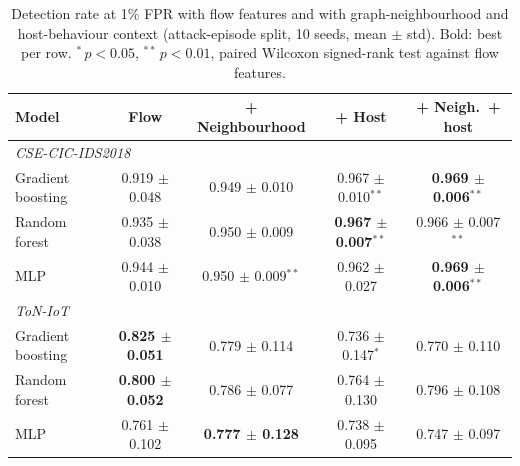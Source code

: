 \begin{table}[t]
\centering
\footnotesize
\caption{Detection rate at 1\% FPR with flow features and with graph-neighbourhood and host-behaviour context (attack-episode split, 10 seeds, mean $\pm$ std). Bold: best per row. $^{*}$\,$p<0.05$, $^{**}$\,$p<0.01$, paired Wilcoxon signed-rank test against flow features.}
\label{tab:context}
\begin{tabular}{lcccc}
\toprule
Model & Flow & + Neighbourhood & + Host & + Neigh.\ + host \\
\midrule
\multicolumn{5}{l}{\textit{CSE-CIC-IDS2018}} \\
\quad Gradient boosting & 0.919 $\pm$ 0.048 & 0.949 $\pm$ 0.010 & 0.967 $\pm$ 0.010$^{**}$ & \textbf{0.969 $\pm$ 0.006}$^{**}$ \\
\quad Random forest & 0.935 $\pm$ 0.038 & 0.950 $\pm$ 0.009 & \textbf{0.967 $\pm$ 0.007}$^{**}$ & 0.966 $\pm$ 0.007$^{**}$ \\
\quad MLP & 0.944 $\pm$ 0.010 & 0.950 $\pm$ 0.009$^{**}$ & 0.962 $\pm$ 0.027 & \textbf{0.969 $\pm$ 0.006}$^{**}$ \\
\multicolumn{5}{l}{\textit{ToN-IoT}} \\
\quad Gradient boosting & \textbf{0.825 $\pm$ 0.051} & 0.779 $\pm$ 0.114 & 0.736 $\pm$ 0.147$^{*}$ & 0.770 $\pm$ 0.110 \\
\quad Random forest & \textbf{0.800 $\pm$ 0.052} & 0.786 $\pm$ 0.077 & 0.764 $\pm$ 0.130 & 0.796 $\pm$ 0.108 \\
\quad MLP & 0.761 $\pm$ 0.102 & \textbf{0.777 $\pm$ 0.128} & 0.738 $\pm$ 0.095 & 0.747 $\pm$ 0.097 \\
\bottomrule
\end{tabular}
\end{table}
